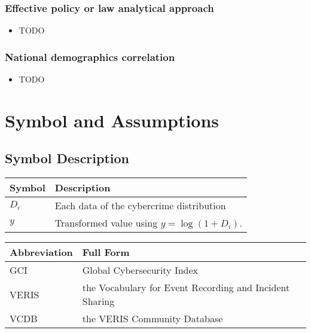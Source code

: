 \documentclass[12pt]{article}
\begin{document}
		\subsubsection[]{Effective policy or law analytical approach} %
			\begin{itemize}
				\item TODO %
			\end{itemize}
		\subsubsection[]{National demographics correlation} %
			\begin{itemize}
				\item TODO %
			\end{itemize}
	
\section{Symbol and Assumptions}\label{sec:symbol-and-assumptions} %
	\subsection{Symbol Description}\label{subsec:symbol-description} %
		\begin{tabular}{ll}
			\textbf{Symbol} & \textbf{Description} \\
			\hline
			$D_i$ & Each data of the cybercrime distribution \\
			\hline
			$y$   & Transformed value using \( y = \log(1 + D_i) \). \\
			\hline
		\end{tabular}

		\medskip

		\noindent
		\begin{tabular}{ll}
			\textbf{Abbreviation} & \textbf{Full Form} \\
			\hline
			GCI   & Global Cybersecurity Index \\
			\hline
			VERIS & the Vocabulary for Event Recording and Incident Sharing \\
			\hline
			VCDB  & the VERIS Community Database \\
			\hline
		\end{tabular}
\end{document}
